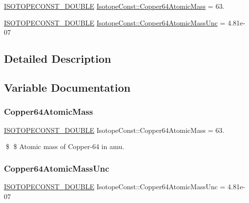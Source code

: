 \begin{DoxyCompactItemize}
\item 
\mbox{\hyperlink{group___isotope_const-_macros_ga8f45a7272ce02c0b4c65c44636ed719a}{I\+S\+O\+T\+O\+P\+E\+C\+O\+N\+S\+T\+\_\+\+D\+O\+U\+B\+LE}} \mbox{\hyperlink{group___isotope_const-_copper-_cu64_ga976df54d03684ebd016d5e07e0fdd0da}{Isotope\+Const\+::\+Copper64\+Atomic\+Mass}} = 63.
\item 
\mbox{\hyperlink{group___isotope_const-_macros_ga8f45a7272ce02c0b4c65c44636ed719a}{I\+S\+O\+T\+O\+P\+E\+C\+O\+N\+S\+T\+\_\+\+D\+O\+U\+B\+LE}} \mbox{\hyperlink{group___isotope_const-_copper-_cu64_ga1046e7973693509b910bf875c4426d40}{Isotope\+Const\+::\+Copper64\+Atomic\+Mass\+Unc}} = 4.\+81e-\/07
\end{DoxyCompactItemize}


\subsection{Detailed Description}


\subsection{Variable Documentation}
\mbox{\label{group___isotope_const-_copper-_cu64_ga976df54d03684ebd016d5e07e0fdd0da}} 
\subsubsection{\texorpdfstring{Copper64\+Atomic\+Mass}{Copper64AtomicMass}}
{\footnotesize\ttfamily \mbox{\hyperlink{group___isotope_const-_macros_ga8f45a7272ce02c0b4c65c44636ed719a}{I\+S\+O\+T\+O\+P\+E\+C\+O\+N\+S\+T\+\_\+\+D\+O\+U\+B\+LE}} Isotope\+Const\+::\+Copper64\+Atomic\+Mass = 63.}

\$ \$ Atomic mass of Copper-\/64 in amu. \mbox{\label{group___isotope_const-_copper-_cu64_ga1046e7973693509b910bf875c4426d40}} 
\subsubsection{\texorpdfstring{Copper64\+Atomic\+Mass\+Unc}{Copper64AtomicMassUnc}}
{\footnotesize\ttfamily \mbox{\hyperlink{group___isotope_const-_macros_ga8f45a7272ce02c0b4c65c44636ed719a}{I\+S\+O\+T\+O\+P\+E\+C\+O\+N\+S\+T\+\_\+\+D\+O\+U\+B\+LE}} Isotope\+Const\+::\+Copper64\+Atomic\+Mass\+Unc = 4.\+81e-\/07}

